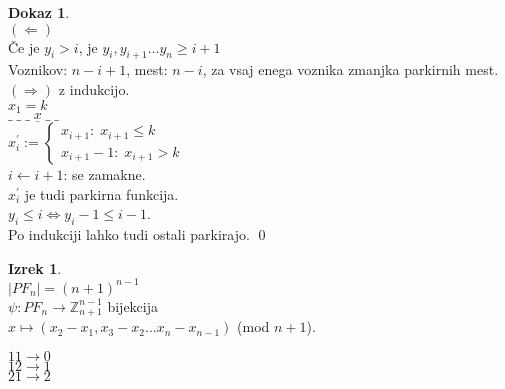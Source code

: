 \documentclass[a4paper, 12pt]{book}
\theoremstyle{definition}
\newtheorem{theorem}[counter]{Izrek}
\newtheorem{pro}[counter]{Dokaz}
\theoremstyle{remark}
\newcommand{\Z}{\mathbb{Z}}
\begin{document}
\begin{pro} \text{} \\
  $(\Leftarrow)$ \\
  Če je $y_i > i$, je $y_i, y_{i+1} \dots y_n \geq i+1$ \\
  Voznikov: $n-i+1$, mest: $n-i$, za vsaj enega voznika zmanjka parkirnih mest. \\
  $(\Rightarrow)$ z indukcijo. \\
  $x_1 = k$ \\
  $\_ \; \_ \; \_ \; \underline{x} \; \_ \; \_$ \\
  $x_i^{'} := \begin{cases}
    x_{i+1}: \; x_{i+1} \leq k \\
    x_{i+1} - 1: \; x_{i+1} > k
  \end{cases}$ \\
  $i \leftarrow i+1$: se zamakne. \\
  $x_i^{'}$ je tudi parkirna funkcija. \\
  $y_i \leq i \iff y_{i}-1 \leq i-1$. \\
  Po indukciji lahko tudi ostali parkirajo.
  \qed
\end{pro}
\begin{theorem} \text{} \\
  $|PF_n| = (n+1)^{n-1}$ \\
  $\psi: PF_n \to \Z_{n+1}^{n-1}$ bijekcija \\
  $x \mapsto (x_2 - x_1, x_3 - x_2 \dots x_n - x_{n-1})$ (mod $n+1$).
\end{theorem}
$1 1 \to 0$ \\
$1 2 \to 1$ \\
$2 1 \to 2$
\end{document}

